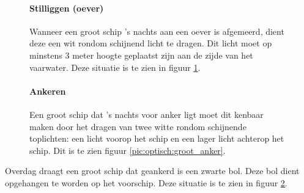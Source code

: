 \begin{figure}[H]
	\centering
	\begin{minipage}[t]{0.75\textwidth}
		\paragraph{Stilliggen (oever)}
		Wanneer een groot schip 's nachts aan een oever is afgemeerd, dient deze een wit rondom schijnend licht te dragen. Dit licht moet op minstens 3 meter hoogte geplaatst zijn aan de zijde van het vaarwater. Deze situatie is te zien in figuur \ref{pic:optisch:groot_stil}.
	\end{minipage}
	\hfill
	\begin{minipage}[t]{0.22\textwidth}
		\RemoveLine
		\caption{}
		\label{pic:optisch:groot_stil}
	\end{minipage}
\end{figure}
\vspace{-0.6cm}
\begin{figure}[H]
	\centering
	\begin{minipage}[t]{0.50\textwidth}
		\paragraph{Ankeren}
		Een groot schip dat 's nachts voor anker ligt moet dit kenbaar maken door het dragen van twee witte rondom schijnende toplichten: een licht voorop het schip en een lager licht achterop het schip. Dit is te zien figuur \ref{pic:optisch:groot_anker}.		
	\end{minipage}
	\hfill
	\begin{minipage}[t]{0.22\textwidth}
		\RemoveLine
		\caption{}
		\label{pic:optisch:groot_anker}
	\end{minipage}
	\hfill
	\begin{minipage}[t]{0.22\textwidth}
	\RemoveLine
	\caption{}
	\label{pic:optisch:groot_anker2}
	\end{minipage}
\end{figure}
\vspace{-0.6cm}
Overdag draagt een groot schip dat geankerd is een zwarte bol. Deze bol dient opgehangen te worden op het voorschip. Deze situatie is te zien in figuur \ref{pic:optisch:groot_anker2}.

